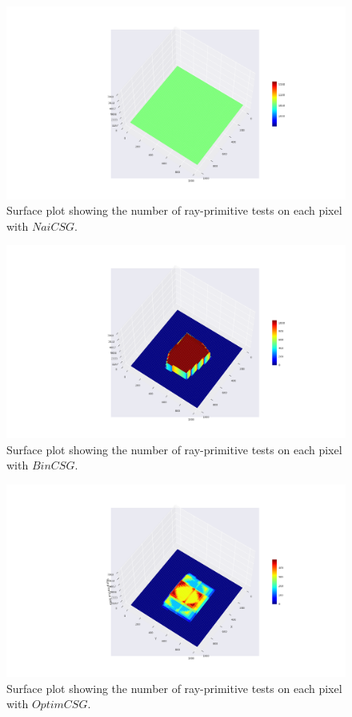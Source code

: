 \documentclass[a4paper,11pt,oneside]{article}
\begin{document}
\begin{figure}[H]
	\centering
	\includegraphics[width=\textwidth]{section5/plots/surface_naive_union.png}
	\caption{Surface plot showing the number of ray-primitive tests on each pixel with $NaiCSG$.}
	\label{sec5.1:test_count_naive}
\end{figure}

\begin{figure}[H]
	\centering
	\includegraphics[width=\textwidth]{section5/plots/surface_bin_union.png}
	\caption{Surface plot showing the number of ray-primitive tests on each pixel with $BinCSG$.}
	\label{sec5.1:test_count_bin}
\end{figure}

\begin{figure}[H]
	\centering
	\includegraphics[width=\textwidth]{section5/plots/surface_optim_union.png}
	\caption{Surface plot showing the number of ray-primitive tests on each pixel with $OptimCSG$.}
	\label{sec5.1:test_count_optim}
\end{figure}
\end{document}
